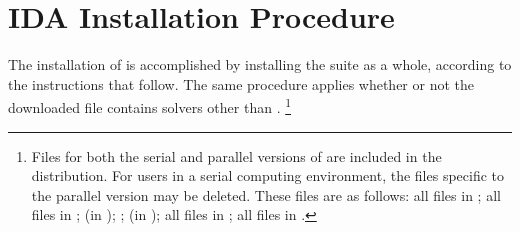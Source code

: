 \chapter{IDA Installation Procedure}\label{s:install}

The installation of {\ida} is accomplished by installing the
{\sundials} suite as a whole, according to the instructions that
follow.   The same procedure applies whether or not the downloaded
file contains solvers other than {\ida}.
\footnote{Files for both the serial and parallel versions of {\ida}
are included in the distribution.  For users in a serial computing
environment, the files specific to the parallel version may be deleted. 
These files are as follows:
all files in ; all files in ;
 (in );
; 
 (in );
all files in ;
all files in .}

